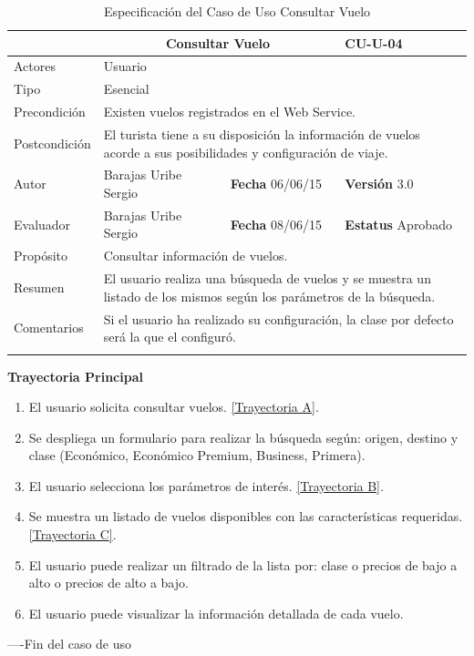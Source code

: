 \begin{longtable}{|p{2.5cm}|p{6.4cm}|p{2cm}|p{2cm}|}
	\hline
		\rowcolor[RGB]{51,153,255}{Caso de Uso}&\multicolumn{2}{c}{Consultar Vuelo}&{\textbf{CU-U-04}}\\
	\hline
		{Actores}&\multicolumn{3}{p{11.2cm}|}{Usuario}\\
	\hline
		{Tipo}&\multicolumn{3}{p{11.2cm}|}{Esencial}\\
	\hline
		{Precondición}&\multicolumn{3}{p{11.2cm}|}{Existen vuelos registrados en el Web Service.}\\
	\hline
		{Postcondición}&\multicolumn{3}{p{11.2cm}|}{El turista tiene a su disposición la información de vuelos acorde a sus posibilidades y configuración de viaje.}\\
	\hline
		{Autor}&{Barajas Uribe Sergio}&{\textbf{Fecha} 06/06/15}&{\textbf{Versión} 3.0}\\
			\hline
		{Evaluador}&{Barajas Uribe Sergio}&{\textbf{Fecha} 08/06/15}&{\textbf{Estatus} Aprobado}\\
	\hline
		{Propósito}&\multicolumn{3}{p{11.2cm}|}{Consultar información de vuelos.}\\
	\hline
		{Resumen}&\multicolumn{3}{p{11.2cm}|}{El usuario realiza una búsqueda de vuelos y se muestra un listado de los mismos según los parámetros de la búsqueda.}\\	
	\hline
		{Comentarios}&\multicolumn{3}{p{11.2cm}|}{Si el usuario ha realizado su configuración, la clase por defecto será la que el configuró.}\\	
	\hline
	\caption[Especificación del Caso de Uso Consultar Vuelo]{Especificación del Caso de Uso Consultar Vuelo}
    	\label{tab:cuConsultarVuelo}
\end{longtable}
\newpage
\begin{flushleft}
	\textbf{Trayectoria Principal}\\
	\begin{enumerate}
		\item El usuario solicita consultar vuelos. \hyperlink{TrayectoriaA_CU-U-04}{[Trayectoria A]}.
		\item Se despliega un formulario para realizar la búsqueda según: origen, destino y clase (Económico, Económico Premium, Business, Primera).
		\item El usuario selecciona los parámetros de interés. \hyperlink{TrayectoriaB_CU-U-04}{[Trayectoria B]}.
		\item Se  muestra un listado de vuelos disponibles con las características requeridas. \hyperlink{TrayectoriaC_CU-U-04}{[Trayectoria C]}.
		\item El usuario puede realizar un filtrado de la lista por: clase o precios de bajo a alto o precios de alto a bajo.
		\item	El usuario puede visualizar la información detallada de cada vuelo.
	\end{enumerate}
\end{flushleft}
----Fin del caso de uso

